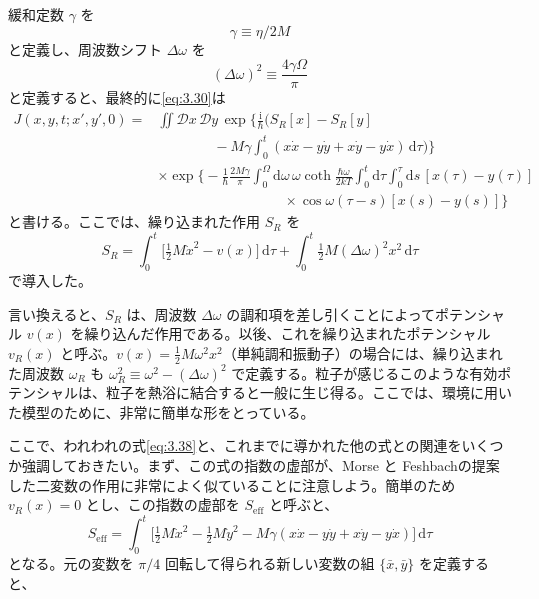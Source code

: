 緩和定数 $\gamma$ を
\begin{equation}
\gamma\equiv\eta/2M
\tag{3.36}\label{eq:3.36}
\end{equation}
と定義し、周波数シフト $\Delta\omega$ を
\begin{equation}
(\Delta\omega)^2\equiv\frac{4\gamma\Omega}{\pi}
\tag{3.37}\label{eq:3.37}
\end{equation}
と定義すると、最終的に\eqref{eq:3.30}は
\begin{equation}
\begin{aligned}
J(x,y,t;x',y',0)
={}&\iint\mathcal D x\,\mathcal D y\,
\exp\biggl\{\frac{\mathrm i}{\hbar}\biggl(
S_R[x]-S_R[y]\\
&\hspace{4em}-M\gamma\int_0^t
(x\dot x-y\dot y+x\dot y-y\dot x)\,\mathrm d\tau\biggr)\biggr\}\\
&\times\exp\biggl\{-\frac{1}{\hbar}\frac{2M\gamma}{\pi}
\int_0^\Omega\!\mathrm d\omega\,\omega\coth\frac{\hbar\omega}{2kT}
\int_0^t\!\mathrm d\tau\int_0^\tau\!\mathrm ds\,
[x(\tau)-y(\tau)]\\
&\hspace{9em}\times\cos\omega(\tau-s)[x(s)-y(s)]\biggr\}
\end{aligned}
\tag{3.38}\label{eq:3.38}
\end{equation}
と書ける。ここでは、繰り込まれた作用 $S_R$ を
\begin{equation}
S_R=\int_0^t\bigl[\tfrac12 M\dot x^2-v(x)\bigr]\,\mathrm d\tau
+\int_0^t\tfrac12 M(\Delta\omega)^2x^2\,\mathrm d\tau
\tag{3.39}\label{eq:3.39}
\end{equation}
で導入した。

言い換えると、$S_R$ は、周波数 $\Delta\omega$ の調和項を差し引くことによってポテンシャル $v(x)$ を繰り込んだ作用である。以後、これを繰り込まれたポテンシャル $v_R(x)$ と呼ぶ。$v(x)=\frac12 M\omega^2x^2$（単純調和振動子）の場合には、繰り込まれた周波数 $\omega_R$ も $\omega_R^2\equiv\omega^2-(\Delta\omega)^2$ で定義する。粒子が感じるこのような有効ポテンシャルは、粒子を熱浴に結合すると一般に生じ得る\cite{ref17}。ここでは、環境に用いた模型のために、非常に簡単な形をとっている。

ここで、われわれの式\eqref{eq:3.38}と、これまでに導かれた他の式との関連をいくつか強調しておきたい。まず、この式の指数の虚部が、Morse と Feshbach\cite{ref25}の提案した二変数の作用に非常によく似ていることに注意しよう。簡単のため $v_R(x)=0$ とし、この指数の虚部を $S_{\mathrm{eff}}$ と呼ぶと、
\begin{equation}
S_{\mathrm{eff}}=\int_0^t\bigl[\tfrac12 M\dot x^2-\tfrac12 M\dot y^2
-M\gamma(x\dot x-y\dot y+x\dot y-y\dot x)\bigr]\,\mathrm d\tau
\tag{3.40}\label{eq:3.40}
\end{equation}
となる。元の変数を $\pi/4$ 回転して得られる新しい変数の組 $\{\bar x,\bar y\}$ を定義すると、


